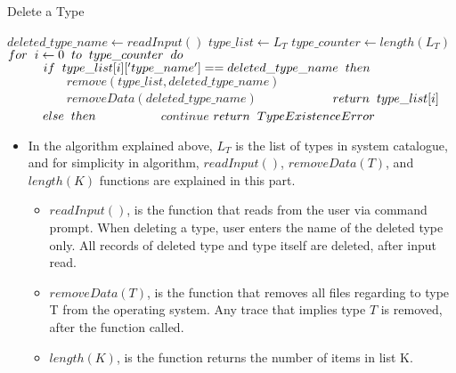 \documentclass[12pt]{report}
\begin{document}
\begin{algorithm}
\caption{Delete a Type}
\begin{algorithmic}[1]
	\STATE $deleted\_type\_name \leftarrow readInput()$
	\STATE $type\_list \leftarrow L_T$
	\STATE $type\_counter \leftarrow length(L_T)$
	\STATE $for\hspace{0.2cm}i\leftarrow0\hspace{0.2cm}to\hspace{0.2cm}type\_counter\hspace{0.2cm}do$
	\STATE $\hspace{1cm}if\hspace{0.2cm}type\_list[i]['type\_name'] == deleted\_type\_name\hspace{0.2cm}then$
	\STATE $\hspace{2cm}remove(type\_list, deleted\_type\_name)$
	\STATE $\hspace{2cm}removeData(deleted\_type\_name)$
	\STATE $\hspace{2cm}return\hspace{0.2cm}type\_list[i]$
	\STATE $\hspace{1cm}else\hspace{0.2cm}then$
	\STATE $\hspace{2cm}continue$
	\STATE $return\hspace{0.2cm}TypeExistenceError$
\end{algorithmic}
\end{algorithm}

\newpage

\begin{itemize}
\item In the algorithm explained above, $L_T$ is the list of types in system catalogue, and for simplicity in algorithm, $readInput()$, $removeData(T)$, and $length(K)$ functions are explained in this part.

\begin{itemize}
\item $readInput()$, is the function that reads from the user via command prompt. When deleting a type, user enters the name of the deleted type only. All records of deleted type and type itself are deleted, after input read.
\item $removeData(T)$, is the function that removes all files regarding to type T from the operating system. Any trace that implies type $T$ is removed, after the function called.
\item $length(K)$, is the function returns the number of items in list K.
\end{itemize}

\end{itemize}
\end{document}
